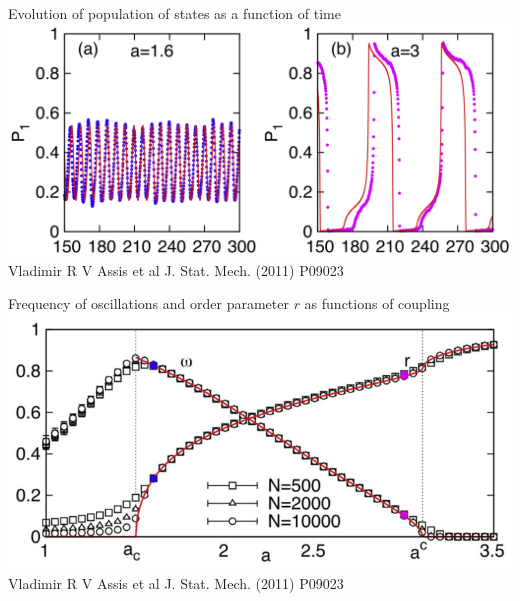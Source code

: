 \documentclass[serif,mathserif]{beamer}
\begin{document}
\begin{frame}
    \centering
    Evolution of population of states as a function of time\\
    \vspace{0.8cm}
    \includegraphics[height=0.6\textheight]{./pop-evolution.eps}\\
    Vladimir R V Assis et al J. Stat. Mech. (2011) P09023
\end{frame}

\begin{frame}
    \centering
    Frequency of oscillations and order parameter $r$ as functions of coupling\\
    \vspace{0.8cm}
    \includegraphics[height=0.6\textheight]{./rvsa.eps}\\
    Vladimir R V Assis et al J. Stat. Mech. (2011) P09023
\end{frame}
\end{document}
